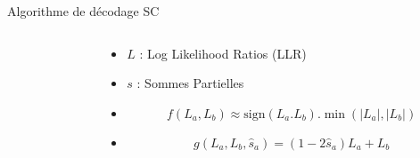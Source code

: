 \begin{frame}[c]{Algorithme de décodage SC}
	\begin{columns}[T] %
		\begin{column}{.65\textwidth}
		\end{column}
		\begin{column}{.35\textwidth}
		\begin{itemize}
			\item<1-> $L$ : Log Likelihood Ratios (LLR)
			\item<3-> $s$ : Sommes Partielles
			\item<4-> $$f(L_a,L_b) \approx \text{sign}(L_a.L_b).\min(|L_a|,|L_b|)$$
			\item<5-> $$g(L_a,L_b,\hat{s}_a) = (1-2\hat{s}_a)L_a+L_b$$
		\end{itemize}
		\end{column}
	\end{columns}

\end{frame}







